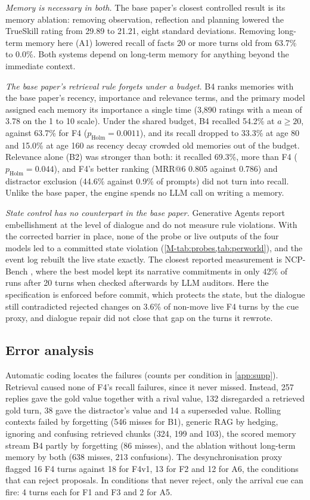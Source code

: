 \documentclass[letterpaper,journal,onecolumn]{IEEEtran}
\begin{document}
\emph{Memory is necessary in both.} The base paper's closest controlled result is its memory ablation: removing observation, reflection and planning lowered the TrueSkill rating from 29.89 to 21.21, eight standard deviations. Removing long-term memory here (A1) lowered recall of facts 20 or more turns old from 63.7\% to 0.0\%. Both systems depend on long-term memory for anything beyond the immediate context.

\emph{The base paper's retrieval rule forgets under a budget.} B4 ranks memories with the base paper's recency, importance and relevance terms, and the primary model assigned each memory its importance a single time (3{,}890 ratings with a mean of 3.78 on the 1 to 10 scale). Under the shared budget, B4 recalled 54.2\% at $a\ge20$, against 63.7\% for F4 ($p_{\text{Holm}}=0.0011$), and its recall dropped to 33.3\% at age 80 and 15.0\% at age 160 as recency decay crowded old memories out of the budget. Relevance alone (B2) was stronger than both: it recalled 69.3\%, more than F4 ($p_{\text{Holm}}=0.044$), and F4's better ranking (MRR@6 0.805 against 0.786) and distractor exclusion (44.6\% against 0.9\% of prompts) did not turn into recall. Unlike the base paper, the engine spends no LLM call on writing a memory.

\emph{State control has no counterpart in the base paper.} Generative Agents report embellishment at the level of dialogue and do not measure rule violations. With the corrected barrier in place, none of the probe or live outputs of the four models led to a committed state violation (\cref{M-tab:probes,tab:perworld}), and the event log rebuilt the live state exactly. The closest reported measurement is NCP-Bench \cite{ma2026ncp}, where the best model kept its narrative commitments in only 42\% of runs after 20 turns when checked afterwards by LLM auditors. Here the specification is enforced before commit, which protects the state, but the dialogue still contradicted rejected changes on 3.6\% of non-move live F4 turns by the cue proxy, and dialogue repair did not close that gap on the turns it rewrote.

\subsection{Error analysis}\label{sec:errors}

Automatic coding locates the failures (counts per condition in \cref{app:supp}). Retrieval caused none of F4's recall failures, since it never missed. Instead, 257 replies gave the gold value together with a rival value, 132 disregarded a retrieved gold turn, 38 gave the distractor's value and 14 a superseded value. Rolling contexts failed by forgetting (546 misses for B1), generic RAG by hedging, ignoring and confusing retrieved chunks (324, 199 and 103), the scored memory stream B4 partly by forgetting (86 misses), and the ablation without long-term memory by both (638 misses, 213 confusions). The desynchronisation proxy flagged 16 F4 turns against 18 for F4v1, 13 for F2 and 12 for A6, the conditions that can reject proposals. In conditions that never reject, only the arrival cue can fire: 4 turns each for F1 and F3 and 2 for A5.
\end{document}
